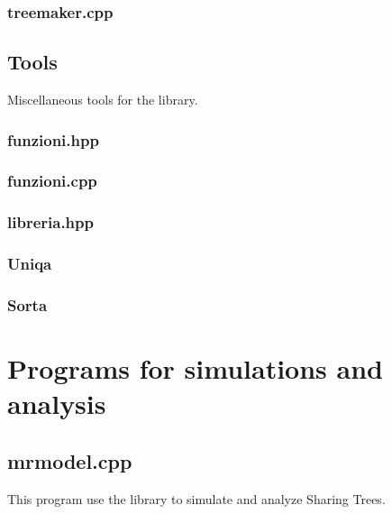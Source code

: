 {\subsubsection{treemaker.cpp}

\vspace{0.5cm}

\subsection{Tools}
Miscellaneous tools for the library.
\subsubsection{funzioni.hpp}

\vspace{0.5cm}
\subsubsection{funzioni.cpp}

\vspace{0.5cm}
\subsubsection{libreria.hpp}

\vspace{0.5cm}
\subsubsection{Uniqa}

\vspace{0.5cm}
\subsubsection{Sorta}

}

\section{Programs for simulations and analysis}

\subsection{mrmodel.cpp}
This program use the library to simulate and analyze Sharing Trees.

\vspace{0.5cm}

